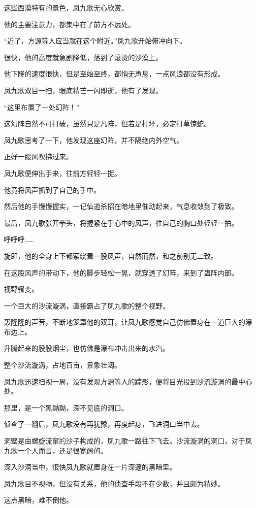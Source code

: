 \begin{this_body}
这些西漠特有的景色，凤九歌无心欣赏。

他的主要注意力，都集中在了前方不远处。

“近了，方源等人应当就在这个附近。”凤九歌开始俯冲向下。

很快，他的高度就急剧降低，落到了滚烫的沙漠上。

他下降的速度很快，但是至始至终，都悄无声息，一点风浪都没有形成。

凤九歌双目一扫，眼底精芒一闪即逝，他有了发现。

“这里布置了一处幻阵！”

这幻阵自然不可打破，虽然只是凡阵，但若是打坏，必定打草惊蛇。

凤九歌思考了一下，他发现这座幻阵，并不隔绝内外空气。

正好一股风吹拂过来。

凤九歌便伸出手来，往前方轻轻一捉。

他竟将风声抓到了自己的手中。

然后他的手慢慢握实，一记仙道杀招在暗地里催动起来，气息收敛到了极致。

最后，凤九歌张开拳头，将握紧在手心中的风声，往自己的胸口处轻轻一拍。

呼呼呼……

旋即，他的全身上下都萦绕着一股风声，自然而然，和之前别无二致。

在这股风声的带动下，他的脚步轻松一晃，就穿透了幻阵，来到了蛊阵内部。

视野骤变。

一个巨大的沙流漩涡，直接霸占了凤九歌的整个视野。

轰隆隆的声音，不断地笼罩他的双耳，让凤九歌感觉自己仿佛置身在一道巨大的瀑布边上。

升腾起来的股股烟尘，也仿佛是瀑布冲击出来的水汽。

整个沙流漩涡，占地百亩，景象壮阔。

凤九歌迅速扫视一周，没有发现方源等人的踪影，便将目光投到沙流漩涡的最中心处。

那里，是一个黑黝黝，深不见底的洞口。

侦查了一翻后，凤九歌没有再犹豫，再度起身，飞进洞口当中去。

洞壁是由螺旋流窜的沙子构成的，凤九歌一路往下飞去。沙流漩涡的洞口，对于凤九歌一个人而言，还是很宽阔的。

深入沙洞当中，很快凤九歌就置身在一片深邃的黑暗里。

凤九歌目不视物，但没有关系，他的侦查手段不在少数，并且颇为精妙。

这点黑暗，难不倒他。


\end{this_body}
